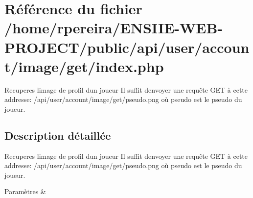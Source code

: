 \hypertarget{user_2account_2image_2get_2index_8php}{}\section{Référence du fichier /home/rpereira/\+E\+N\+S\+I\+I\+E-\/\+W\+E\+B-\/\+P\+R\+O\+J\+E\+C\+T/public/api/user/account/image/get/index.php}
\label{user_2account_2image_2get_2index_8php}


Recuperes l\textquotesingle{}image de profil d\textquotesingle{}un joueur Il suffit d\textquotesingle{}envoyer une requête G\+ET à cette addresse\+: \textquotesingle{}/api/user/account/image/get/pseudo.png\textquotesingle{} où \textquotesingle{}pseudo\textquotesingle{} est le pseudo du joueur.  




\subsection{Description détaillée}
Recuperes l\textquotesingle{}image de profil d\textquotesingle{}un joueur Il suffit d\textquotesingle{}envoyer une requête G\+ET à cette addresse\+: \textquotesingle{}/api/user/account/image/get/pseudo.png\textquotesingle{} où \textquotesingle{}pseudo\textquotesingle{} est le pseudo du joueur. 


\begin{DoxyParams}{Paramètres}
{\em } & \\
\hline
\end{DoxyParams}
